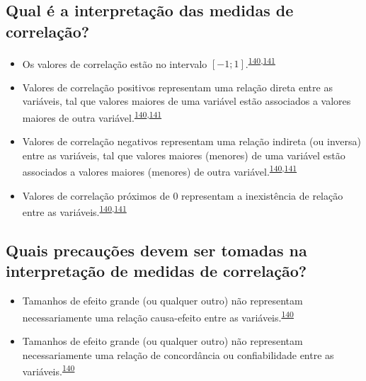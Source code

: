 \documentclass[
]{book}
\begin{document}
\hypertarget{qual-uxe9-a-interpretauxe7uxe3o-das-medidas-de-correlauxe7uxe3o}{%
\subsection{Qual é a interpretação das medidas de correlação?}\label{qual-uxe9-a-interpretauxe7uxe3o-das-medidas-de-correlauxe7uxe3o}}

\begin{itemize}
\item
  Os valores de correlação estão no intervalo \([-1; 1]\).\textsuperscript{\protect\hyperlink{ref-khamis2008}{140},\protect\hyperlink{ref-allison2022}{141}}
\item
  Valores de correlação positivos representam uma relação direta entre as variáveis, tal que valores maiores de uma variável estão associados a valores maiores de outra variável.\textsuperscript{\protect\hyperlink{ref-khamis2008}{140},\protect\hyperlink{ref-allison2022}{141}}
\item
  Valores de correlação negativos representam uma relação indireta (ou inversa) entre as variáveis, tal que valores maiores (menores) de uma variável estão associados a valores maiores (menores) de outra variável.\textsuperscript{\protect\hyperlink{ref-khamis2008}{140},\protect\hyperlink{ref-allison2022}{141}}
\item
  Valores de correlação próximos de \(0\) representam a inexistência de relação entre as variáveis.\textsuperscript{\protect\hyperlink{ref-khamis2008}{140},\protect\hyperlink{ref-allison2022}{141}}
\end{itemize}

\hypertarget{quais-precauuxe7uxf5es-devem-ser-tomadas-na-interpretauxe7uxe3o-de-medidas-de-correlauxe7uxe3o}{%
\subsection{Quais precauções devem ser tomadas na interpretação de medidas de correlação?}\label{quais-precauuxe7uxf5es-devem-ser-tomadas-na-interpretauxe7uxe3o-de-medidas-de-correlauxe7uxe3o}}

\begin{itemize}
\item
  Tamanhos de efeito grande (ou qualquer outro) não representam necessariamente uma relação causa-efeito entre as variáveis.\textsuperscript{\protect\hyperlink{ref-khamis2008}{140}}
\item
  Tamanhos de efeito grande (ou qualquer outro) não representam necessariamente uma relação de concordância ou confiabilidade entre as variáveis.\textsuperscript{\protect\hyperlink{ref-khamis2008}{140}}
\end{itemize}
\end{document}
